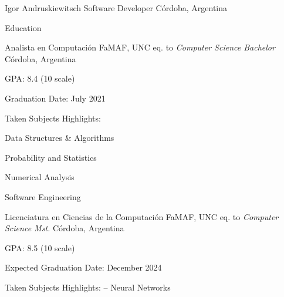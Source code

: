 \documentclass{curriculum}
\begin{document}

\begin{cvheader}

\makeheader
    {Igor Andruskiewitsch}  {}
    {Software Developer}    {}
    {Córdoba, Argentina}    {}

\end{cvheader}


\begin{cvsection}{Education}

    \makesectionitemheader
        {Analista en Computación}                 {FaMAF, UNC}
        {eq. to \it{Computer Science Bachelor}}   {Córdoba, Argentina}
        \begin{sectionitemlist}
        \item { GPA: 8.4 (10 scale) }
        \item { Graduation Date: July 2021 }
        \item { Taken Subjects Highlights: }
            \begin{colsectionitemlist}{3}
                \item{Data Structures \& Algorithms}
                \item{Probability and Statistics}
                \item{Numerical Analysis}
                \item{Software Engineering}
            \end{colsectionitemlist}
        \end{sectionitemlist}

    \makesectionitemheader
        {Licenciatura en Ciencias de la Computación}    {FaMAF, UNC}
        {eq. to \it{Computer Science Mst.}}             {Córdoba, Argentina}
        \begin{sectionitemlist}
        \item { GPA: 8.5 (10 scale) }
        \item { Expected Graduation Date: December 2024 }
        \item { Taken Subjects Highlights: – Neural Networks}
        \end{sectionitemlist}

\end{cvsection}

\end{document}
